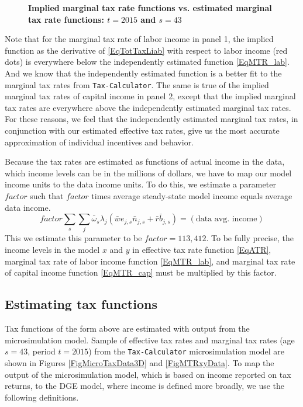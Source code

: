 \documentclass[letterpaper,12pt]{article}
\theoremstyle{definition}
\begin{document}
\begin{spacing}{1.5}
    \begin{figure}[htbp]\centering \captionsetup{width=6.0in}
      \caption{\label{FigEstVderMTRxy}\textbf{Implied marginal tax rate functions vs. estimated marginal tax rate functions: $t=2015$ and $s=43$}}
    \end{figure}

    Note that for the marginal tax rate of labor income in panel 1, the implied function as the derivative of \eqref{EqTotTaxLiab} with respect to labor income (red dots) is everywhere below the independently estimated function \eqref{EqMTR_lab}. And we know that the independently estimated function is a better fit to the marginal tax rates from \texttt{Tax-Calculator}. The same is true of the implied marginal tax rates of capital income in panel 2, except that the implied marginal tax rates are everywhere above the independently estimated marginal tax rates. For these reasons, we feel that the independently estimated marginal tax rates, in conjunction with our estimated effective tax rates, give us the most accurate approximation of individual incentives and behavior.

    Because the tax rates are estimated as functions of actual income in the data, which income levels can be in the millions of dollars, we have to map our model income units to the data income units. To do this, we estimate a parameter $factor$ such that $factor$ times average steady-state model income equals average data income.
    \begin{equation}\label{EqIncFactor}
      factor\sum_s \sum_j \bar{\omega}_s\lambda_j\left(\bar{w}e_{j,s}\bar{n}_{j,s} + \bar{r}\bar{b}_{j,s}\right) = \left(\text{data avg. income}\right)
    \end{equation}
    This we estimate this parameter to be $factor=113,412$. To be fully precise, the income levels in the model $x$ and $y$ in effective tax rate function \eqref{EqATR}, marginal tax rate of labor income function \eqref{EqMTR_lab}, and marginal tax rate of capital income function \eqref{EqMTR_cap} must be multiplied by this factor.


  \subsection{Estimating tax functions}\label{SecEstTaxFunc}

    Tax functions of the form above are estimated with output from the microsimulation model. Sample of effective tax rates and marginal tax rates (age $s=43$, period $t=2015$) from the \texttt{Tax-Calculator} microsimulation model are shown in Figures \ref{FigMicroTaxData3D} and \ref{FigMTRxyData}. To map the output of the microsimulation model, which is based on income reported on tax returns, to the DGE model, where income is defined more broadly, we use the following definitions.


\end{spacing}
\end{document}
